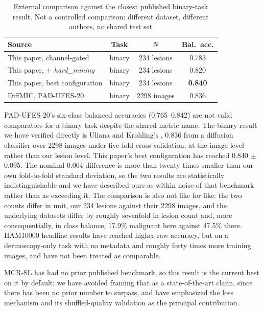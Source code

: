 \documentclass[conference]{IEEEtran}
\begin{document}
\begin{table}[htbp]
\caption{External comparison against the closest published binary-task result. Not a controlled comparison: different dataset, different authors, no shared test set}
\label{tab:comparison}
\centering
\scriptsize
\setlength{\tabcolsep}{3pt}
\begin{tabular}{|l|c|c|c|}
\hline
\textbf{Source} & \textbf{Task} & \textbf{$N$} & \textbf{Bal.\ acc.} \\
\hline
This paper, channel-gated & binary & 234 lesions & 0.783 \\
This paper, $+$ \emph{hard\_mining} & binary & 234 lesions & 0.820 \\
This paper, best configuration & binary & 234 lesions & \textbf{0.840} \\
\hline
DiffMIC, PAD-UFES-20 \cite{diffmic} & binary & 2298 images & 0.836 \\
\hline
\end{tabular}
\end{table} PAD-UFES-20's six-class balanced accuracies (0.765--0.842) are not valid comparators for a binary task despite the shared metric name. The binary result we have verified directly is Uliana and Krohling's \cite{diffmic}, 0.836 from a diffusion classifier over 2298 images under five-fold cross-validation, at the image level rather than our lesion level. This paper's best configuration has reached 0.840 $\pm$ 0.095. The nominal 0.004 difference is more than twenty times smaller than our own fold-to-fold standard deviation, so the two results are statistically indistinguishable and we have described ours as within noise of that benchmark rather than as exceeding it. The comparison is also not like for like: the two counts differ in unit, our 234 lesions against their 2298 images, and the underlying datasets differ by roughly sevenfold in lesion count and, more consequentially, in class balance, 17.9\% malignant here against 47.5\% there. HAM10000 \cite{ham10000} headline results have reached higher raw accuracy, but on a dermoscopy-only task with no metadata and roughly forty times more training images, and have not been treated as comparable.

MCR-SL has had no prior published benchmark, so this result is the current best on it by default; we have avoided framing that as a state-of-the-art claim, since there has been no prior number to surpass, and have emphasized the loss mechanism and its shuffled-quality validation as the principal contribution.
\end{document}
